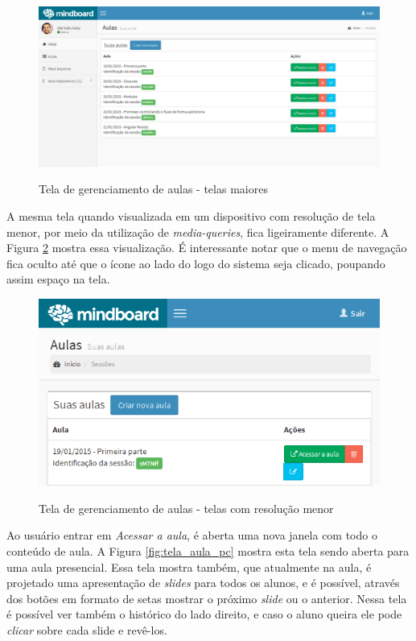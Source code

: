 \begin{figure}[h]
\centering
\caption{Tela de gerenciamento de aulas - telas maiores}
\includegraphics[width=1.0\textwidth]{imgs/tela_aulas.png} 
\label{fig:tela_aulas} 
\end{figure}

A mesma tela quando visualizada em um dispositivo com resolução de tela menor, por meio da utilização de \emph{media-queries}, fica ligeiramente diferente. A Figura \ref{fig:tela_aulas_mob} mostra essa visualização. É interessante notar que o menu de navegação fica oculto até que o ícone ao lado do logo do sistema seja clicado, poupando assim espaço na tela.

\begin{figure}[h]
\centering
\caption{Tela de gerenciamento de aulas - telas com resolução menor}
\includegraphics[width=1.0\textwidth]{imgs/tela_aulas_mob_paisagem.png} 
\label{fig:tela_aulas_mob} 
\end{figure}

Ao usuário entrar em \emph{Acessar a aula}, é aberta uma nova janela com todo o conteúdo de aula. A Figura \ref{fig:tela_aula_pc} mostra esta tela sendo aberta para uma aula presencial. Essa tela mostra também, que atualmente na aula, é projetado uma apresentação de \emph{slides} para todos os alunos, e é possível, através dos botões em formato de setas mostrar o próximo \emph{slide} ou o anterior. Nessa tela é possível ver também o histórico do lado direito, e caso o aluno queira ele pode \emph{clicar} sobre cada slide e revê-los.

